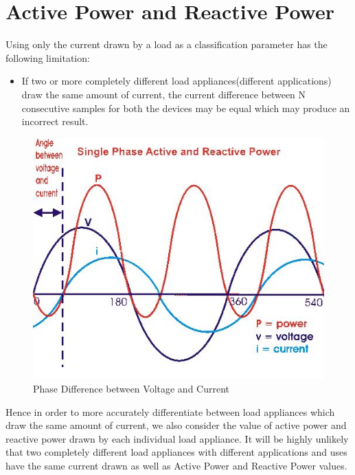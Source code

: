 \section{Active Power and Reactive Power}
{
Using only the current drawn by a load as a classification parameter has the following limitation:
\begin{itemize}
  \item If two or more completely different load appliances(different applications) draw the same amount of current, the current difference between N consecutive samples for both the devices may be equal which may produce an incorrect result.
 \end{itemize}
 
 \begin{figure}[H]
	    \includegraphics[scale=1]{images/phasediff.JPG}
	    \centering
	    \caption{Phase Difference between Voltage and Current}
	    \label{cdiff}
	\end{figure}

 
 Hence in order to more accurately differentiate between load appliances which draw the same amount of current, we also consider the value of active power and reactive power drawn by each individual load appliance. It will be highly unlikely that two completely different load appliances with different applications and uses have the same current drawn as well as Active Power and Reactive Power values.
}

